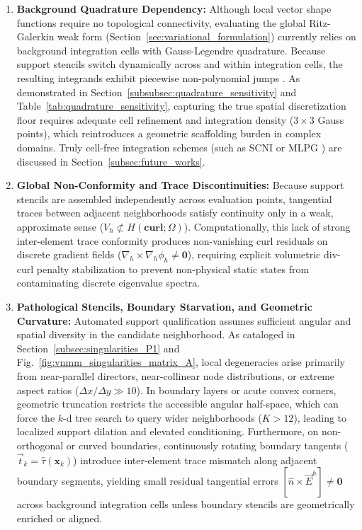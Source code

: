 \documentclass[preprint,12pt]{elsarticle}
\begin{document}
\begin{enumerate}
    \item \textbf{Background Quadrature Dependency:}
          Although local vector shape functions require no topological connectivity, evaluating the global Ritz-Galerkin weak form (Section~\ref{sec:variational_formulation}) currently relies on background integration cells with Gauss-Legendre quadrature. Because support stencils switch dynamically across and within integration cells, the resulting integrands exhibit piecewise non-polynomial jumps \cite{dolbow1999numerical}. As demonstrated in Section~\ref{subsubsec:quadrature_sensitivity} and Table~\ref{tab:quadrature_sensitivity}, capturing the true spatial discretization floor requires adequate cell refinement and integration density ($3 \times 3$ Gauss points), which reintroduces a geometric scaffolding burden in complex domains. Truly cell-free integration schemes (such as SCNI \cite{chen2001stabilized} or MLPG \cite{atluri2002meshless}) are discussed in Section~\ref{subsec:future_works}.

    \item \textbf{Global Non-Conformity and Trace Discontinuities:}
          Because support stencils are assembled independently across evaluation points, tangential traces between adjacent neighborhoods satisfy continuity only in a weak, approximate sense ($V_h \not\subset H(\mathbf{curl}; \Omega)$). Computationally, this lack of strong inter-element trace conformity produces non-vanishing curl residuals on discrete gradient fields ($\nabla_h \times \nabla_h \phi_h \neq \mathbf{0}$), requiring explicit volumetric div-curl penalty stabilization to prevent non-physical static states from contaminating discrete eigenvalue spectra.

    \item \textbf{Pathological Stencils, Boundary Starvation, and Geometric Curvature:}
          Automated support qualification assumes sufficient angular and spatial diversity in the candidate neighborhood. As cataloged in Section~\ref{subsec:singularities_P1} and Fig.~\ref{fig:vnmm_singularities_matrix_A}, local degeneracies arise primarily from near-parallel directors, near-collinear node distributions, or extreme aspect ratios ($\Delta x / \Delta y \gg 10$). In boundary layers or acute convex corners, geometric truncation restricts the accessible angular half-space, which can force the $k$-d tree search to query wider neighborhoods ($K > 12$), leading to localized support dilation and elevated conditioning. Furthermore, on non-orthogonal or curved boundaries, continuously rotating boundary tangents ($\vec{t}_k = \hat{\tau}(\mathbf{x}_k)$) introduce inter-element trace mismatch along adjacent boundary segments, yielding small residual tangential errors $[\hat{n} \times \vec{E}^h] \neq \mathbf{0}$ across background integration cells unless boundary stencils are geometrically enriched or aligned.


\end{enumerate}
\end{document}

